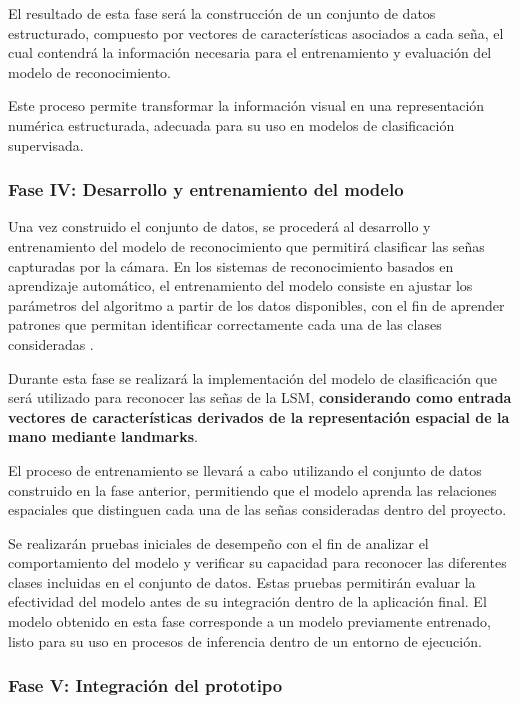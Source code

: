 	El resultado de esta fase será la construcción de un conjunto de datos
	estructurado, compuesto por vectores de características asociados a cada seña,
	el cual contendrá la información necesaria para el entrenamiento y evaluación
	del modelo de reconocimiento.
	
	Este proceso permite transformar la información visual en una representación numérica estructurada, adecuada para su uso en modelos de clasificación supervisada.
	
	\subsubsection{Fase IV: Desarrollo y entrenamiento del modelo}
	
	Una vez construido el conjunto de datos, se procederá al desarrollo y
	entrenamiento del modelo de reconocimiento que permitirá clasificar las
	señas capturadas por la cámara. En los sistemas de reconocimiento basados en
	aprendizaje automático, el entrenamiento del modelo consiste en ajustar los
	parámetros del algoritmo a partir de los datos disponibles, con el fin
	de aprender patrones que permitan identificar correctamente cada una de las
	clases consideradas \cite{goodfellow2016,geron2019}.
	
	Durante esta fase se realizará la implementación del modelo de clasificación
	que será utilizado para reconocer las señas de la LSM, \textbf{considerando como entrada vectores de características derivados de la representación espacial de la mano mediante landmarks}.
	
	El proceso de entrenamiento se llevará a cabo utilizando el conjunto de datos
	construido en la fase anterior, permitiendo que el modelo aprenda las
	relaciones espaciales que distinguen cada una de las señas consideradas dentro del
	proyecto.
	
	Se realizarán pruebas iniciales de desempeño con el fin de analizar el
	comportamiento del modelo y verificar su capacidad para reconocer las
	diferentes clases incluidas en el conjunto de datos. Estas pruebas permitirán
	evaluar la efectividad del modelo antes de su integración dentro de la
	aplicación final. El modelo obtenido en esta fase corresponde a un modelo previamente entrenado, listo para su uso en procesos de inferencia dentro de un entorno de ejecución.
	
	\subsubsection{Fase V: Integración del prototipo}
	
